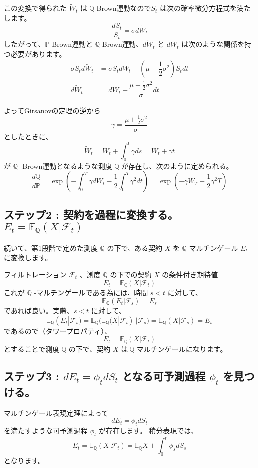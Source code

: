 \documentclass[uplatex,a4j,12pt,dvipdfmx]{jsarticle}
\begin{document}
この変換で得られた $\tilde{W}_{t}$ は $\mathbb{Q}$-Brown運動なので$S_{t}$ は次の確率微分方程式を満たします。
$$\dfrac{dS_{t}}{S_{t}} = \sigma d \tilde{W}_{t}$$
したがって、$\mathbb{P}$-Brown運動と $\mathbb{Q}$-Brown運動、$d \tilde{W}_{t}$ と $d W_{t}$ は次のような関係を持つ必要があります。
\begin{align*}
	\sigma S_{t} d \tilde{W}_{t} & = \sigma S_{t} d W_{t} + \left( \mu + \dfrac{1}{2} \sigma^{2} \right) S_{t} dt \\
	d \tilde{W}_{t}              & = d W_{t} + \dfrac{ \mu + \frac{1}{2} \sigma^{2} }{\sigma} dt
\end{align*}

よってGirsanovの定理の逆から
$$ \gamma = \dfrac{ \mu + \frac{1}{2} \sigma^{2} }{\sigma} $$
としたときに、
$$ \tilde{W}_{t} = W_{t} + \int^{t}_{0} \gamma ds = W_{t} + \gamma t $$
が $\mathbb{Q}$ -Brown運動となるような測度 $\mathbb{Q}$ が存在し、次のように定められる。
$$ \dfrac{d \mathbb{Q}}{d \mathbb{P}} = \exp \left( - \int^{T}_{0} \gamma d W_{t} - \dfrac{1}{2} \int^{T}_{0} \gamma^{2} dt \right) = \exp \left( - \gamma W_{T} - \dfrac{1}{2} \gamma^{2} T \right) $$

\subsection{ステップ2 : 契約を過程に変換する。 $E_{t} = \mathbb{E}_{\mathbb{Q}}( X | \mathcal{F}_{t})$}
続いて、第1段階で定めた測度 $\mathbb{Q}$ の下で、ある契約 $X$ を $\mathbb{Q}$-マルチンゲール $E_{t}$ に変換します。

フィルトレーション $\mathcal{F}_{t}$ 、測度 $\mathbb{Q}$ の下での契約 $X$ の条件付き期待値
$$E_{t} = \mathbb{E}_{\mathbb{Q}}(X|\mathcal{F}_{t})$$
これが $\mathbb{Q}$ -マルチンゲールである為には、時間 $s<t$ に対して、
$$\mathbb{E}_{\mathbb{Q}}( E_{t} | \mathcal{F}_{s} ) = E_{s}$$
であれば良い。実際、$s<t$ に対して、
$$ \mathbb{E}_{\mathbb{Q}}( E_{t} | \mathcal{F}_{s} ) = \mathbb{E}_{\mathbb{Q}} \Big( \mathbb{E}_{\mathbb{Q}}(X|\mathcal{F}_{t}) \ | \mathcal{F}_{s} \Big) = \mathbb{E}_{\mathbb{Q}}(X|\mathcal{F}_{s}) = E_{s} $$
であるので（タワープロパティ）、
$$ E_{t} = \mathbb{E}_{\mathbb{Q}}(X|\mathcal{F}_{t}) $$
とすることで測度 $\mathbb{Q}$ の下で、契約 $X$ は $\mathbb{Q}$-マルチンゲールになります。

\subsection{ステップ3 : $dE_{t} = \phi_{t} d S_{t}$ となる可予測過程 $\phi_{t}$ を見つける。 }
マルチンゲール表現定理によって
$$dE_{t} = \phi_{t} dS_{t}$$
を満たすような可予測過程 $\phi_{t}$ が存在します。
積分表現では、
$$E_{t} = \mathbb{E}_{\mathbb{Q}}(X|\mathcal{F}_{t}) = \mathbb{E}_{\mathbb{Q}} X + \int^{t}_{0} \phi_{s} d S_{s}$$
となります。
\end{document}

